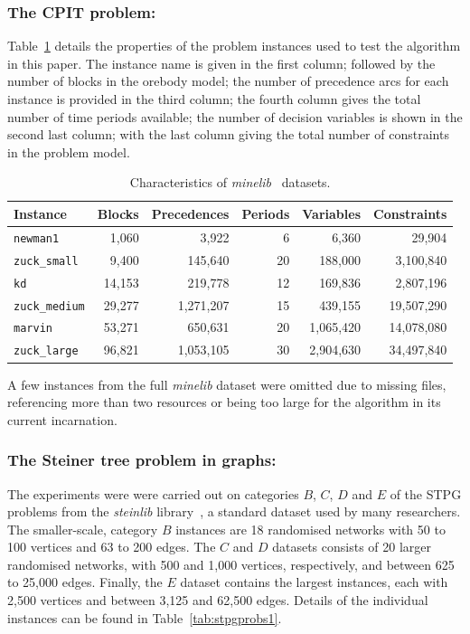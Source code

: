 \documentclass[journal]{IEEEtran}
\begin{document}
\subsubsection*{The CPIT problem:}
Table~\ref{tab:datasets} details the properties of the problem instances used to test the algorithm in this paper. The instance name is given in the first column; followed by the number of blocks in the orebody model; the number of precedence arcs for each instance is provided in the third column; the fourth column gives the total number of time periods available; the number of decision variables is shown in the second last column; with the last column giving the total number of constraints in the problem model.\par
%
\begin{table}[h!]
\centering
\caption{Characteristics of \emph{minelib}~\cite{espinoza_minelib:_2012} datasets.}\label{tab:datasets}
\begin{adjustbox}{width=0.48\textwidth}
\begin{tabular}{lrrrrr} \toprule
Instance & Blocks & Precedences & Periods & Variables & Constraints\\
\hline
\texttt{newman1} & 1,060 & 3,922 & 6 & 6,360 & 29,904\\
\texttt{zuck\_small} & 9,400 & 145,640 & 20 & 188,000 & 3,100,840\\
\texttt{kd} & 14,153 & 219,778 & 12 & 169,836 & 2,807,196\\
\texttt{zuck\_medium} & 29,277 & 1,271,207 & 15 & 439,155 & 19,507,290\\
\texttt{marvin} & 53,271 & 650,631 & 20 & 1,065,420 & 14,078,080\\
\texttt{zuck\_large} & 96,821 & 1,053,105 & 30 & 2,904,630 & 34,497,840\\
\bottomrule
\end{tabular}
\end{adjustbox}
\end{table}
%
A few instances from the full \emph{minelib} dataset were omitted due to missing files, referencing more than two resources or being too large for the algorithm in its current incarnation.

\subsubsection*{The Steiner tree problem in graphs:}

The experiments were were carried out on categories $B$, $C$, $D$ and $E$ of the STPG problems from the \textit{steinlib} library~\cite{steinlib}, a standard dataset used by many researchers. The smaller-scale, category $B$ instances are 18 randomised networks with 50 to 100 vertices and 63 to 200 edges. The $C$ and $D$ datasets consists of 20 larger randomised networks, with 500 and 1,000 vertices, respectively, and between 625 to 25,000 edges. Finally, the $E$ dataset contains the largest instances, each with 2,500 vertices and between 3,125 and 62,500 edges. Details of the individual instances can be found in Table~\ref{tab:stpgprobs1}. 
\end{document}
